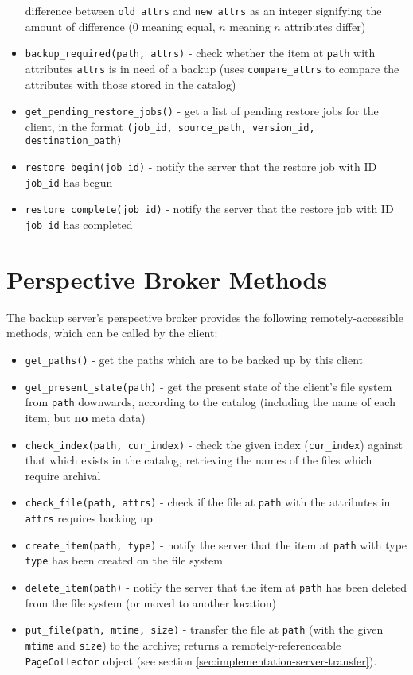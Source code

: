 \begin{itemize}
        difference between \verb!old_attrs! and \verb!new_attrs! as an integer
        signifying the amount of difference ($0$ meaning equal, $n$ meaning $n$
        attributes differ)
    \item \verb!backup_required(path, attrs)! - check whether the item at
        \verb!path! with attributes \verb!attrs! is in need of a backup (uses
        \verb!compare_attrs! to compare the attributes with those stored in the
        catalog)
    \item \verb!get_pending_restore_jobs()! - get a list of pending restore
        jobs for the client, in the format
        \verb!(job_id, source_path, version_id, destination_path)!
    \item \verb!restore_begin(job_id)! - notify the server that the restore job
        with ID \verb!job_id! has begun
    \item \verb!restore_complete(job_id)! - notify the server that the restore
        job with ID \verb!job_id! has completed
\end{itemize}

\section{Perspective Broker Methods}
\label{sec:appendix-server-pb-methods}

The backup server's perspective broker provides the following
remotely-accessible methods, which can be called by the client:

\begin{itemize}
    \item \verb!get_paths()! - get the paths which are to be backed up by this
        client
    \item \verb!get_present_state(path)! - get the present state of the
        client's file system from \verb!path! downwards, according to the
        catalog (including the name of each item, but \textbf{no} meta data)
    \item \verb!check_index(path, cur_index)! - check the given index
        (\verb!cur_index!) against that which exists in the catalog, retrieving
        the names of the files which require archival
    \item \verb!check_file(path, attrs)! - check if the file at \verb!path!
        with the attributes in \verb!attrs! requires backing up
    \item \verb!create_item(path, type)! - notify the server that the item at
        \verb!path! with type \verb!type! has been created on the file system
    \item \verb!delete_item(path)! - notify the server that the item at
        \verb!path! has been deleted from the file system (or moved to another
        location)
    \item \verb!put_file(path, mtime, size)! - transfer the file at \verb!path!
        (with the given \verb!mtime! and \verb!size!) to the archive; returns
        a remotely-referenceable \verb!PageCollector! object (see section
        \ref{sec:implementation-server-transfer}).
\end{itemize}

